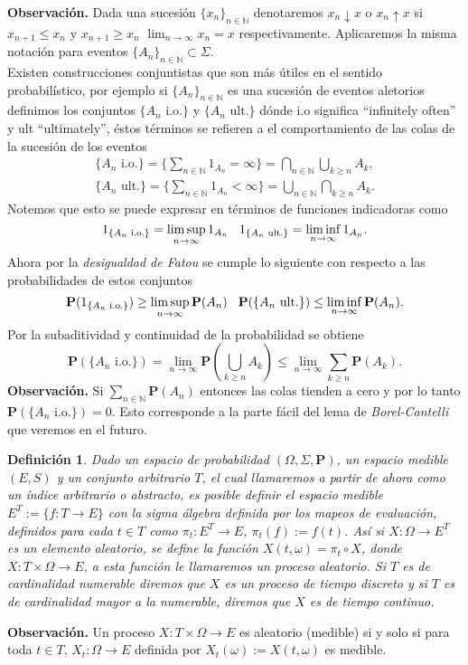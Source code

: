 \documentclass[letterpaper]{article}
\newtheorem{def.}{Definici\'on}[section]
\newcommand{\nat}{\ensuremath{ \mathbb N }}
\newcommand{\prob}{\textbf{P}}
\newcommand{\obs}{{\newline \noindent \sc \textbf{Observación. }}}
\newcommand{\om}{\ensuremath{\Omega}}
\newcommand{\sig}{\ensuremath{\Sigma}}
\begin{document}
\obs Dada una sucesión \(\{x_n\}_{n\in\nat}\) denotaremos \(x_n\downarrow x\) o \(x_n\uparrow x\) si \(x_{n+1}\leq x_n\) y \(x_{n+1}\geq x_n\) \(\lim_{n\rightarrow\infty}x_n=x\) respectivamente. Aplicaremos la misma notación para eventos \(\{A_n\}_{n\in\nat}\subset\sig\).\\[0pt]
Existen construcciones conjuntistas que son más útiles en el sentido probabilístico, por ejemplo si \(\{A_n\}_{n\in\nat}\) es una sucesión de eventos aletorios definimos los conjuntos \(\{A_n\text{ i.o.}\}\) y \(\{A_n\text{ ult.}\}\) dónde i.o significa ``infinitely often'' y ult ``ultimately'', éstos términos se refieren a el comportamiento de las colas de la sucesión de los eventos
\begin{align*}
\{A_n\text{ i.o.}\}=\Big\{\sum_{n\in\nat}1_{A_n}=\infty\Big\}=\bigcap_{n\in\nat}\bigcup_{k\geq n}A_k,\\
\{A_n\text{ ult.}\}=\Big\{\sum_{n\in\nat}1_{A_n}<\infty\Big\}=\bigcup_{n\in\nat}\bigcap_{k\geq n}A_k.
\end{align*}
\noindent Notemos que esto se puede expresar en términos de funciones indicadoras como
\[
1_{\{A_n\text{ i.o.}\}}=\limsup_{n\rightarrow\infty}1_{A_n} \hspace{0.3cm} 1_{\{A_n\text{ ult.}\}}=\liminf_{n\rightarrow\infty}1_{A_n}.
\]
\noindent Ahora por la \emph{desigualdad de Fatou} se cumple lo siguiente con respecto a las probabilidades de estos conjuntos
\[
\prob(1_{\{A_n\text{ i.o.}\}})\geq\limsup_{n\rightarrow\infty}\prob(A_n)\hspace{0.3cm} \prob({\{A_n\text{ ult.}\}})\leq\liminf_{n\rightarrow\infty}\prob(A_n).
\]
\noindent Por la subaditividad y continuidad de la probabilidad se obtiene
\[
 \prob(\{A_n\text{ i.o.}\})=\lim_{n\rightarrow\infty}\prob(\bigcup_{k\geq n} A_k)\leq\lim_{n\rightarrow\infty}\sum_{k\geq n}\prob(A_k).
\]
\obs Si \(\sum_{n\in\nat}\prob(A_n)\) entonces las colas tienden a cero y por lo tanto \(\prob(\{A_n\text{ i.o.}\})=0\). Esto corresponde a la parte fácil del lema de \emph{Borel-Cantelli} que veremos en el futuro.

\begin{def.}
Dado un espacio de probabilidad \((\om,\sig,\prob)\), un espacio medible \((E,S)\) y un conjunto arbitrario \(T\), el cual llamaremos a partir de ahora como un \emph{índice arbitrario o abstracto}, es posible definir el espacio medible \(E^{T}:=\{f:T\rightarrow E\}\) con la sigma álgebra definida por los mapeos de evaluación, definidos para cada \(t\in T\) como \(\pi_t:E^{T}\rightarrow E\), \(\pi_t(f):=f(t)\). Así si \(X:\om\rightarrow E^{T}\) es un elemento aleatorio, se define la función \(X(t,\omega)=\pi_t\circ X\), donde \(X:T\times\om\rightarrow E\), a esta función le llamaremos un \emph{proceso aleatorio}. Si \(T\) es de cardinalidad numerable diremos que \(X\) es un proceso de tiempo discreto y si \(T\) es de cardinalidad mayor a la numerable, diremos que \(X\) es de tiempo continuo.
\end{def.}
\obs Un proceso \(X:T\times\om\rightarrow E\) es aleatorio (medible) si y solo si para toda \(t\in T\), \(X_t:\om\rightarrow E\) definida por \(X_t(\omega):=X(t,\omega)\) es medible.
\end{document}
